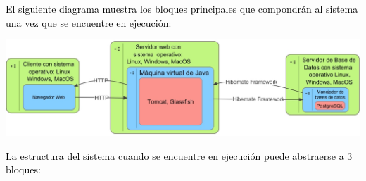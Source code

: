 \documentclass[11pt,letterpaper,titlepage]{article}
\begin{document}
\textcolor{black}{El siguiente diagrama muestra los bloques principales que compondr\'an al sistema una vez que se encuentre en ejecuci\'on:}

\begin{center} 
\includegraphics[width=440pt]{arq2.png}
\end{center}
\textcolor{black}{La estructura del sistema cuando se encuentre en ejecuci\'on puede abstraerse a 3 bloques:}
\end{document}
